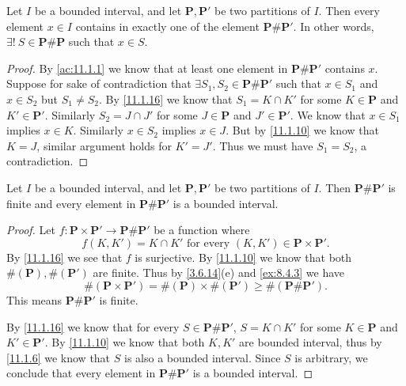 \begin{ac}\label{ac:11.1.2}
  Let \(I\) be a bounded interval, and let \(\mathbf{P}, \mathbf{P}'\) be two partitions of \(I\).
  Then every element \(x \in I\) contains in exactly one of the element \(\mathbf{P} \# \mathbf{P}'\).
  In other words, \(\exists!\ S \in \mathbf{P} \# \mathbf{P}\) such that \(x \in S\).
\end{ac}

\begin{proof}
  By \cref{ac:11.1.1} we know that at least one element in \(\mathbf{P} \# \mathbf{P}'\) contains \(x\).
  Suppose for sake of contradiction that \(\exists S_1, S_2 \in \mathbf{P} \# \mathbf{P}'\) such that \(x \in S_1\) and \(x \in S_2\) but \(S_1 \neq S_2\).
  By \cref{11.1.16} we know that \(S_1 = K \cap K'\) for some \(K \in \mathbf{P}\) and \(K' \in \mathbf{P}'\).
  Similarly \(S_2 = J \cap J'\) for some \(J \in \mathbf{P}\) and \(J' \in \mathbf{P}'\).
  We know that \(x \in S_1\) implies \(x \in K\).
  Similarly \(x \in S_2\) implies \(x \in J\).
  But by \cref{11.1.10} we know that \(K = J\), similar argument holds for \(K' = J'\).
  Thus we must have \(S_1 = S_2\), a contradiction.
\end{proof}

\begin{ac}\label{ac:11.1.3}
  Let \(I\) be a bounded interval, and let \(\mathbf{P}, \mathbf{P}'\) be two partitions of \(I\).
  Then \(\mathbf{P} \# \mathbf{P}'\) is finite and every element in \(\mathbf{P} \# \mathbf{P}'\) is a bounded interval.
\end{ac}

\begin{proof}
  Let \(f : \mathbf{P} \times \mathbf{P}' \to \mathbf{P} \# \mathbf{P}'\) be a function where
  \[
    f(K, K') = K \cap K' \text{ for every } (K, K') \in \mathbf{P} \times \mathbf{P}'.
  \]
  By \cref{11.1.16} we see that \(f\) is surjective.
  By \cref{11.1.10} we know that both \(\#(\mathbf{P}), \#(\mathbf{P}')\) are finite.
  Thus by \cref{3.6.14}(e) and \cref{ex:8.4.3} we have
  \[
    \#(\mathbf{P} \times \mathbf{P}') = \#(\mathbf{P}) \times \#(\mathbf{P}') \geq \#(\mathbf{P} \# \mathbf{P}').
  \]
  This means \(\mathbf{P} \# \mathbf{P}'\) is finite.

  By \cref{11.1.16} we know that for every \(S \in \mathbf{P} \# \mathbf{P}'\), \(S = K \cap K'\) for some \(K \in \mathbf{P}\) and \(K' \in \mathbf{P}'\).
  By \cref{11.1.10} we know that both \(K, K'\) are bounded interval, thus by \cref{11.1.6} we know that \(S\) is also a bounded interval.
  Since \(S\) is arbitrary, we conclude that every element in \(\mathbf{P} \# \mathbf{P}'\) is a bounded interval.
\end{proof}

